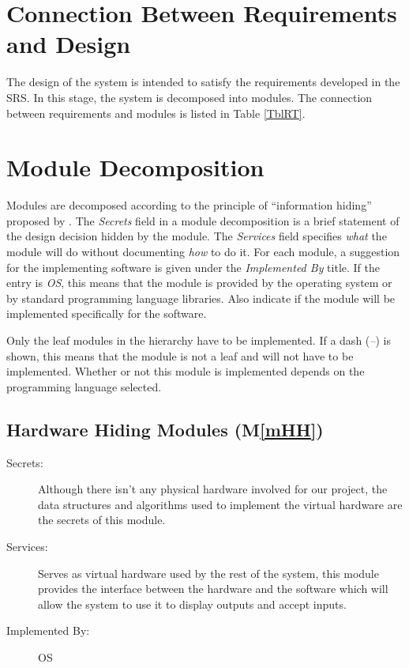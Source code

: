 \documentclass[12pt, titlepage]{article}
\newcommand{\mref}[1]{M\ref{#1}}
\begin{document}
\section{Connection Between Requirements and Design} \label{SecConnection}

The design of the system is intended to satisfy the requirements developed in
the SRS. In this stage, the system is decomposed into modules. The connection
between requirements and modules is listed in Table \ref{TblRT}.

\section{Module Decomposition} \label{SecMD}

Modules are decomposed according to the principle of ``information hiding''
proposed by \citet{ParnasEtAl1984}. The \emph{Secrets} field in a module
decomposition is a brief statement of the design decision hidden by the
module. The \emph{Services} field specifies \emph{what} the module will do
without documenting \emph{how} to do it. For each module, a suggestion for the
implementing software is given under the \emph{Implemented By} title. If the
entry is \emph{OS}, this means that the module is provided by the operating
system or by standard programming language libraries.  Also indicate if the
module will be implemented specifically for the software.

Only the leaf modules in the
hierarchy have to be implemented. If a dash (\emph{--}) is shown, this means
that the module is not a leaf and will not have to be implemented. Whether or
not this module is implemented depends on the programming language
selected.

\subsection{Hardware Hiding Modules (\mref{mHH})}

\begin{description}
\item[Secrets:]Although there isn't any physical hardware involved for our project, the data structures and algorithms used to implement the virtual hardware are the secrets of this module.
\item[Services:]Serves as virtual hardware used by the rest of the system, this module provides the interface between the hardware and the software which will allow the system to use it to display outputs and accept inputs.
\item[Implemented By:] OS
\end{description}
\end{document}
